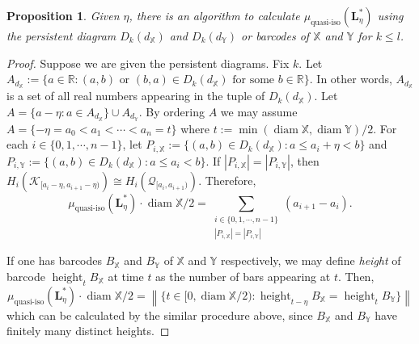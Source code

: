 \documentclass[11pt]{article}
\newtheorem{proposition}[theorem]{Proposition}
\newcommand{\norm}[1]{\left\lVert#1\right\rVert}
\newcommand{\R}{\mathbb{R}} %
\newcommand{\matL}{\mathbf{L}} %
\DeclareMathOperator*{\diam}{diam} %
\newcommand{\httt}{\operatorname{height}} %
\newcommand{\ptcloudx}{\mathbb{X}} %
\newcommand{\ptcloudy}{\mathbb{Y}} %
\begin{document}
\begin{proposition}
	Given $\eta$, there is an algorithm to calculate $\mu_{\operatorname{quasi-iso}}(\matL^{\ast}_{\eta})$ using the persistent diagram $D_{k}(d_{\ptcloudx})$ and $D_{k}(d_{\ptcloudy})$ or barcodes of $\ptcloudx$ and $\ptcloudy$ for $k \leq l$.
\end{proposition}
\begin{proof}
	Suppose we are given the persistent diagrams. Fix $k$. Let $A_{d_{\ptcloudx}}:=\{a \in \R : (a,b) \text{ or } (b,a) \in  D_{k}(d_{\ptcloudx}) \text{ for some }b \in \R \}.$ In other words, $A_{d_{\ptcloudx}}$ is a set of all real numbers appearing in the tuple of $D_{k}(d_{\ptcloudx})$. Let $A=\{ a-\eta: a \in A_{d_{\ptcloudx}} \}\cup A_{d_{\ptcloudy}}$. By ordering $A$ we may assume $A=\{ -\eta=a_{0} < a_{1}  < \cdots < a_{n}=t \}$ where $t:= \min(\diam\ptcloudx,\diam\ptcloudy)/2$. For each $i \in \{ 0,1, \cdots, n-1\}$, let $P_{i,\ptcloudx}:=\{(a,b) \in D_{k}(d_{\ptcloudx}): a\leq a_{i}+\eta< b \}$ and $P_{i,\ptcloudy}:=\{(a,b) \in D_{k}(d_{\ptcloudx}): a\leq a_{i}< b \}$. If $|P_{i,\ptcloudx}| = |P_{i,\ptcloudy}|$, then $H_{i}(\mathcal{K}_{[a_{i}-\eta,a_{i+1}-\eta)}) \cong H_{i}(\mathcal{Q}_{[a_{i},a_{i+1})})$. Therefore, $$\mu_{\operatorname{quasi-iso}}(\matL^{\ast}_{\eta}) \cdot \diam \ptcloudx/2 = \sum_{\substack{i \in \{ 0,1, \cdots, n-1\} \\ |P_{i,\ptcloudx}| = |P_{i,\ptcloudy}| }} (a_{i+1}-a_{i}).$$
	
If one has barcodes $B_{\ptcloudx}$ and $B_{\ptcloudy}$ of $\ptcloudx$ and $\ptcloudy$ respectively, we may define \emph{height} of barcode $\httt_{t} B_{\ptcloudx}$  at time $t$ as the number of bars appearing at $t$. Then, $$\mu_{\operatorname{quasi-iso}}(\matL^{\ast}_{\eta}) \cdot \diam \ptcloudx/2= \norm{\{t \in [0,\diam \ptcloudx/2): \httt_{t-\eta} B_{\ptcloudx} =\httt_{t} B_{\ptcloudy}\}}$$ 
which can be calculated by the similar procedure above, since $B_{\ptcloudx}$ and $B_{\ptcloudy}$ have finitely many distinct heights.
\end{proof}
\end{document}
